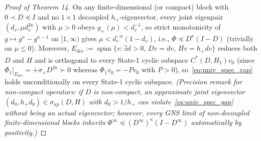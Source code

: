 \documentclass[10pt,letterpaper]{article}
\begin{document}
\begin{proof}[Proof of Theorem 14]
On any finite-dimensional (or compact) block with $0 \prec D \preceq I$ and no $1\times 1$ decoupled $h_+$-eigenvector, every joint eigenpair $(d_v, \mu d_v^{2\kappa})$ with $\mu > 0$ obeys $g_+(\mu) < d_v^{-1}$, so strict monotonicity of $g \mapsto g^\kappa - g^{\kappa-1}$ on $[1, \infty)$ gives $\mu < d_v^{-\kappa}(1 - d_v)$, i.e., $\Phi \preceq D^\kappa(I - D)$ (trivially on $\mu \le 0$). Moreover, $E_{\mathrm{dec}} := \overline{\operatorname{span}}\{v : \exists d>0,\, Dv = dv,\, Hv = h_+ d v\}$ reduces both $D$ and $H$ and is orthogonal to every State-1 cyclic subspace $\overline{C^*(D, H_1)v_0}$ (since $\Phi_1|_{E_{\mathrm{dec}}} = +\sigma_+ D^{2\kappa} \succ 0$ whereas $\Phi_1 v_0 = -P v_0$ with $P > 0$), so~\eqref{eq:univ_spec_gap} holds unconditionally on every State-1 cyclic subspace. \emph{(Precision remark for non-compact operators: if $D$ is non-compact, an approximate joint eigenvector $(d_0, h_+ d_0) \in \sigma_{\mathrm{ap}}(D, H)$ with $d_0 > 1/h_+$ can violate~\eqref{eq:univ_spec_gap} without being an actual eigenvector; however, every GNS limit of non-decoupled finite-dimensional blocks inherits $\Phi^\infty \preceq (D^\infty)^\kappa(I - D^\infty)$ automatically by positivity.)}


\end{proof}
\end{document}
